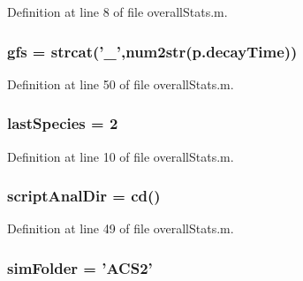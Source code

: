 Definition at line 8 of file overall\+Stats.\+m.

\hypertarget{a00032_a5714ee99d309183e59b051e92e5a44d1}{
\subsubsection[{gfs}]{\setlength{\rightskip}{0pt plus 5cm}gfs = strcat('\+\_\+',num2str({\bf p.\+decay\+Time}))}}\label{a00032_a5714ee99d309183e59b051e92e5a44d1}


Definition at line 50 of file overall\+Stats.\+m.

\hypertarget{a00032_aad7be196243f3c9ca83dfee7c9111014}{
\subsubsection[{last\+Species}]{ last\+Species = 2}}\label{a00032_aad7be196243f3c9ca83dfee7c9111014}


Definition at line 10 of file overall\+Stats.\+m.

\hypertarget{a00032_a2a07fff00b80967a40ae67d91fd31cb4}{
\subsubsection[{script\+Anal\+Dir}]{ script\+Anal\+Dir = {\bf cd}()}}\label{a00032_a2a07fff00b80967a40ae67d91fd31cb4}


Definition at line 49 of file overall\+Stats.\+m.

\hypertarget{a00032_aa671e3345005bd599e662bcaa115b18a}{
\subsubsection[{sim\+Folder}]{ sim\+Folder = 'A\+C\+S2'}}\label{a00032_aa671e3345005bd599e662bcaa115b18a}


